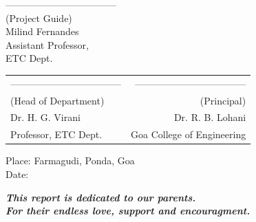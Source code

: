 \noindent -----------------------------------\\
(Project Guide)\\
Milind Fernandes\\
Assistant Professor,\\
ETC Dept.\\



\begin{table}[H]
\begin{tabular}{lr}
\noindent ----------------------------------- & \hspace{6cm} ----------------------------------- \\
(Head of Department) & (Principal)\\
Dr. H. G. Virani & Dr. R. B. Lohani \\
Professor, ETC Dept. & Goa College of Engineering\\
\end{tabular}
\end{table}
\noindent Place: Farmagudi, Ponda, Goa\\
\noindent Date: 

\newpage

\begin{center}
\textbf{\textit {This report is dedicated to our parents.\\
For their endless love, support and encouragment.}}

\end {center}
\clearpage